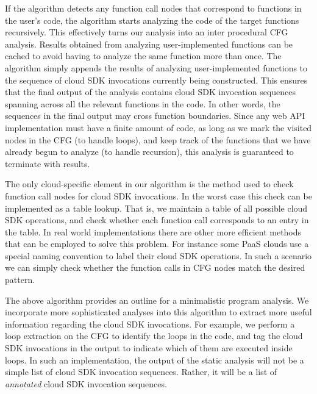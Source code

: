 If the algorithm detects any function call nodes that correspond to functions in the user's code, the algorithm
starts analyzing the code of the target functions recursively. This effectively turns our analysis into an inter procedural
CFG analysis. Results obtained from analyzing user-implemented functions can be cached to avoid
having to analyze the same function more than once. The algorithm simply appends the results of
analyzing user-implemented functions to the sequence of cloud SDK invocations currently being constructed. 
This ensures that the final output of the
analysis contains cloud SDK invocation sequences spanning across all the relevant functions in the code. 
In other words, the sequences in the final output may cross function boundaries.
Since any web API implementation must have a finite amount of code, as long as
we mark the visited nodes in the CFG (to handle loops), and keep track of the functions that we have 
already begun to analyze (to handle recursion), this analysis is guaranteed to terminate with results.

 
The only cloud-specific element in our algorithm is the method used to check function call nodes for cloud SDK invocations.
 In the worst case this check can be implemented as a table lookup. That is, we maintain a table of all possible cloud
 SDK operations, and check whether each function call
 corresponds to an entry in the table. In real world implementations there are other more efficient methods that
 can be employed to solve this problem. For instance some PaaS clouds use a special naming convention to label
 their cloud SDK operations. 
 In such a scenario we can simply check whether the function calls in CFG nodes match the
 desired pattern. 
 
The above algorithm provides an outline for a minimalistic program analysis.
We incorporate more sophisticated analyses into this algorithm to extract more
useful information regarding the cloud SDK invocations. For example, we perform a loop extraction on the
CFG to identify the loops in the code, and tag the cloud SDK invocations in the output to indicate which of them
are executed inside loops. In such an implementation, the output of the static analysis will not be a simple
list of cloud SDK invocation sequences. Rather, it will be a list of \textit{annotated} cloud SDK invocation sequences.

